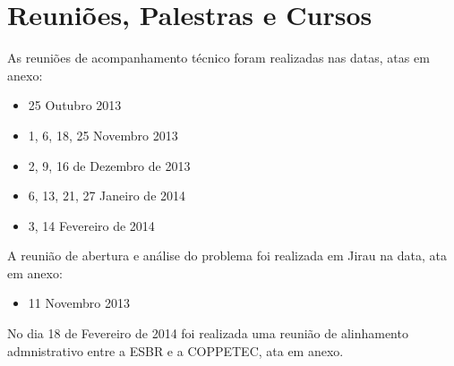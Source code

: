 

\section{Reuniões, Palestras e Cursos}
\label{reunioes_palestras_e_cursos}

As reuniões de acompanhamento técnico foram realizadas nas datas, atas em anexo:
\begin{itemize} 
	\item 25 Outubro 2013
	\item 1, 6, 18, 25 Novembro 2013
	\item 2, 9, 16 de Dezembro de 2013
	\item 6, 13, 21, 27 Janeiro de 2014
	\item 3, 14  Fevereiro de 2014

\end{itemize} 

A reunião de abertura e análise do problema foi realizada em Jirau na data, ata em anexo: 
\begin{itemize} 
	\item 11 Novembro 2013
\end{itemize} 

No dia 18 de Fevereiro de 2014 foi realizada uma reunião de alinhamento admnistrativo entre a ESBR e a COPPETEC, ata em anexo. 
   	


